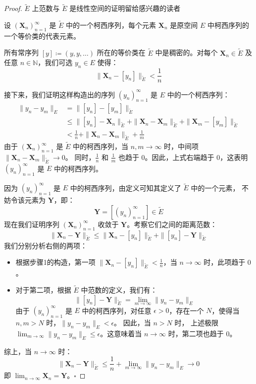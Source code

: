 \begin{proof}
    \(\tilde{E}\) 上范数与 \(\tilde{E}\) 是线性空间的证明留给感兴趣的读者

    设 \((\mathbf{X}_n)_{n=1}^\infty\) 是 \(\tilde{E}\) 中的一个柯西序列，每个元素
    \(\mathbf{X}_n\) 是原空间 \(E\) 中柯西序列的一个等价类的代表元素。

    所有常序列 \([y] \coloneqq(y, y, \dots)\) 所在的等价类在 \(\tilde{E}\) 中是稠密的。对每个
    \(\mathbf{X}_n \in \tilde{E}\) 及任意 \(n \in \mathbb{N}\)，我们可选
    \(y_n \in E\) 使得：
    \[ \| \mathbf{X}_n - [y_n] \|_{\tilde{E}} < \frac{1}{n} \]

    接下来，我们证明这样构造出的序列 \((y_n)_{n=1}^\infty\) 是 \(E\) 中的一个柯西序列：
    \begin{align*}
        \|y_n - y_m\|_E &= \|[y_n] - [y_m]\|_{\tilde{E}} \\
        &\le \|[y_n] - \mathbf{X}_n\|_{\tilde{E}} + \|\mathbf{X}_n -
        \mathbf{X}_m\|_{\tilde{E}} + \|\mathbf{X}_m - [y_m]\|_{\tilde{E}} \\
        &< \frac{1}{n} + \|\mathbf{X}_n - \mathbf{X}_m\|_{\tilde{E}}
        + \frac{1}{m}
    \end{align*}
    由于 \((\mathbf{X}_n)_{n=1}^\infty\) 是 \(\tilde{E}\) 中的柯西序列，当 \(n, m \to
    \infty\) 时，中间项 \(\|\mathbf{X}_n - \mathbf{X}_m\|_{\tilde{E}} \to 0\)。
    同时，\(\frac{1}{n}\) 和 \(\frac{1}{m}\) 也趋于 \(0\)。因此，上式右端趋于 \(0\)，这表明
    \((y_n)_{n=1}^\infty\) 是 \(E\) 中的柯西序列。

    因为 \((y_n)_{n=1}^\infty\) 是 \(E\) 中的柯西序列，由定义可知其定义了 \(\tilde{E}\) 中的一个元素，
    不妨令该元素为 \(\mathbf{Y}\)，即：
    \[
        \mathbf{Y} = [(y_n)_{n=1}^\infty] \in \tilde{E}
    \]
    现在我们证明序列 \((\mathbf{X}_n)_{n=1}^\infty\) 收敛于 \(\mathbf{Y}\)。考察它们之间的距离范数：
    \[
        \|\mathbf{X}_n - \mathbf{Y}\|_{\tilde{E}} \le \|\mathbf{X}_n -
        [y_n]\|_{\tilde{E}} + \|[y_n] - \mathbf{Y}\|_{\tilde{E}}
    \]
    我们分别分析右侧的两项：

    \begin{itemize}
        \item 根据步骤1的构造，第一项 \(\|\mathbf{X}_n - [y_n]\|_{\tilde{E}} <
            \frac{1}{n}\)，当 \(n \to \infty\) 时，此项趋于 \(0\)。
        \item 对于第二项，根据 \(\tilde{E}\) 中范数的定义，我们有：
            \[ \|[y_n] - \mathbf{Y}\|_{\tilde{E}} = \lim_{m \to \infty} \|y_n
            - y_m\|_E \]
            由于 \((y_n)_{n=1}^\infty\) 是 \(E\) 中的柯西序列，对任意
            \(\epsilon > 0\)，存在一个
            \(N\)，使得当 \(n, m > N\) 时，\(\|y_n - y_m\|_E < \epsilon\)。
            因此，当 \(n > N\) 时，
            上述极限 \(\lim_{m \to \infty} \|y_n - y_m\|_E \le \epsilon\)。这意味着当 \(n
            \to \infty\) 时，第二项也趋于 \(0\)。
    \end{itemize}

    综上，当 \(n \to \infty\) 时：
    \[ \|\mathbf{X}_n - \mathbf{Y}\|_{\tilde{E}} \le \frac{1}{n} +
    \lim_{m \to \infty} \|y_n - y_m\|_E \to 0 \]
    即 \(\lim_{n \to \infty} \mathbf{X}_n = \mathbf{Y}\)。\(\square\)
\end{proof}

